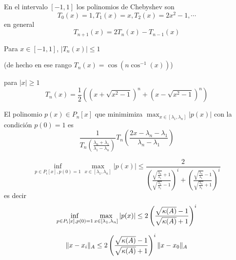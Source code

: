 En el intervalo $[-1,1]$ los polinomios de Chebyshev son
$$
T_0(x)=1,T_1(x)=x,T_2(x)=2x^2-1,\cdots 
$$
en general
$$
T_{n+1}(x)=2T_{n}(x)-T_{n-1}(x)
$$

Para $x\in [-1,1]$, $|T_n(x)|\le 1$ 

(de hecho 
en ese rango $T_n(x)=\cos(n\cos^{-1}(x))$)

para $|x|\ge 1$
$$
T_n(x)=\frac12\left((x+\sqrt{x^2-1})^n+ (x-\sqrt{x^2-1})^n\right)
$$


El polinomio $p(x)\in P_n[x]$ que minimimiza $\max_{x\in [\lambda_1,\lambda_n]}|p(x)|$ con la condición $p(0)=1$ es
$$
\frac{1}{T_n(\frac{\lambda_n+\lambda_1}{\lambda_1-\lambda_n})}T_n\left(\frac{2x-\lambda_n-\lambda_1}{\lambda_n-\lambda_1}\right)$$


$$
\inf_{p\in P_i[x],p(0)=1}\max_{x\in [\lambda_1,\lambda_n]}|p(x)|
\le \frac{2}{\left( \frac{\sqrt{\frac{\lambda_n}{\lambda_1}}+1}{\sqrt{\frac{\lambda_n}{\lambda_1}}-1}\right)^i+\left( \frac{\sqrt{\frac{\lambda_n}{\lambda_1}}-1}{\sqrt{\frac{\lambda_n}{\lambda_1}}+1}\right)^i}$$ 
es decir
$$
\inf_{p\in P_i[x],p(0)=1}\max_{x\in [\lambda_1,\lambda_n]}|p(x)|
\le 2\left(\frac{\sqrt{\kappa(\Ab)}-1}{\sqrt{\kappa(\Ab)}+1}\right)^i
$$
 
$$\|\xb-\xb_i\|_{A}\le 2\left(\frac{\sqrt{\kappa(\Ab)}-1}{\sqrt{\kappa(\Ab)}+1}\right)^i\|\xb-\xb_0\|_{A}$$

 